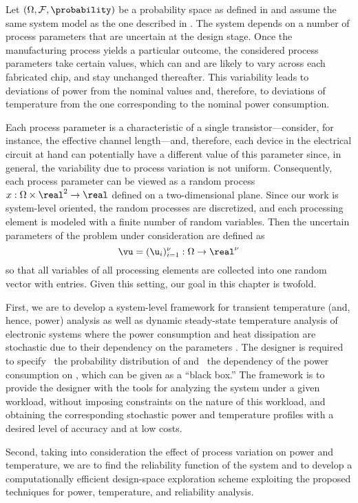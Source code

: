Let $(\Omega, \mathcal{F}, \probability)$ be a probability space as defined in
 and assume the same system model as the one described
in . The system depends on a number of process parameters
that are uncertain at the design stage. Once the manufacturing process yields a
particular outcome, the considered process parameters take certain values, which
can and are likely to vary across each fabricated chip, and stay unchanged
thereafter. This variability leads to deviations of power from the nominal
values and, therefore, to deviations of temperature from the one corresponding
to the nominal power consumption.

Each process parameter is a characteristic of a single transistor---consider,
for instance, the effective channel length---and, therefore, each device in the
electrical circuit at hand can potentially have a different value of this
parameter since, in general, the variability due to process variation is not
uniform. Consequently, each process parameter can be viewed as a random process
$x: \Omega \times \real^2 \to \real$ defined on a two-dimensional plane. Since
our work is system-level oriented, the random processes are discretized, and
each processing element is modeled with a finite number of random variables.
Then the uncertain parameters of the problem under consideration are defined as
\[
  \vu = (\u_i)_{i = 1}^\nu: \Omega \to \real^\nu
\]
so that all variables of all processing elements are collected into one random
vector with \nu entries. Given this setting, our goal in this chapter is
twofold.

First, we are to develop a system-level framework for transient temperature
(and, hence, power) analysis as well as dynamic steady-state temperature
analysis of electronic systems where the power consumption and heat dissipation
are stochastic due to their dependency on the parameters \vu. The designer is
required to specify \one~the probability distribution of \vu and \two~the
dependency of the power consumption on \vu, which can be given as a ``black
box.'' The framework is to provide the designer with the tools for analyzing the
system under a given workload, without imposing constraints on the nature of
this workload, and obtaining the corresponding stochastic power \mp and
temperature \mq profiles with a desired level of accuracy and at low costs.

Second, taking into consideration the effect of process variation on power and
temperature, we are to find the reliability function of the system and to
develop a computationally efficient design-space exploration scheme exploiting
the proposed techniques for power, temperature, and reliability analysis.
